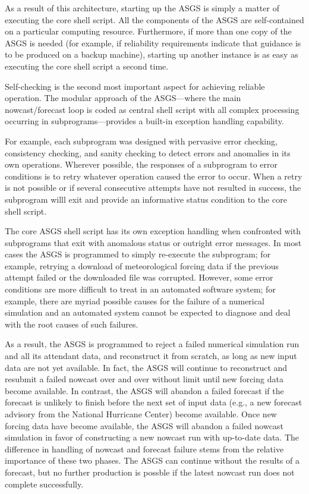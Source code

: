 \documentclass[jmse,article,submit,moreauthors,pdftex,12pt,a4paper]{mdpi}
\begin{document}
As a result of this architecture, starting up the ASGS is simply a 
matter of executing the core shell script. All the components of the 
ASGS are self-contained on a particular computing resource. 
Furthermore, if more than one copy of the ASGS is needed (for 
example, if reliability requirements indicate that guidance is to be 
produced on a backup machine), starting up another instance is as 
easy as executing the core shell script a second time.

Self-checking is the second most important aspect for achieving 
reliable operation. The modular approach of the ASGS---where the 
main nowcast/forecast loop is coded as central shell script with all 
complex processing occurring in subprograms---provides a built-in
exception handling capability. 

For example, each subprogram was designed with pervasive error 
checking, consistency checking, and sanity checking to detect errors 
and anomalies in its own operations. Wherever possible, the 
responses of a subprogram to error conditions is to retry whatever 
operation caused the error to occur. When a retry is not possible or 
if several consecutive attempts have not resulted in success, the 
subprogram willl exit and provide an informative status condition to 
the core shell script. 

The core ASGS shell script has its own exception handling when 
confronted with subprograms that exit with anomalous status or 
outright error messages. In most cases the ASGS is programmed to 
simply re-execute the subprogram; for example, retrying a download 
of meteorological forcing data if the previous attempt failed or the 
downloaded file was corrupted. However, some error conditions are 
more difficult to treat in an automated software system; for 
example, there are myriad possible causes for the failure of a 
numerical simulation and an automated system cannot be expected to 
diagnose and deal with the root causes of such failures. 

As a result, the ASGS is programmed to reject a failed numerical 
simulation run and all its attendant data, and reconstruct it from 
scratch, as long as new input data are not yet available. In fact, 
the ASGS will continue to reconstruct and resubmit a failed nowcast 
over and over without limit until new forcing data become available. 
In contrast, the ASGS will abandon a failed forecast if the forecast 
is unlikely to finish before the next set of input data (e.g., a new 
forecast advisory from the National Hurricane Center) become 
available. Once new forcing data have become available, the ASGS 
will abandon a failed nowcast simulation in favor of constructing a 
new nowcast run with up-to-date data. The difference in handling of 
nowcast and forecast failure stems from the relative importance of 
these two phases. The ASGS can continue without the results of a 
forecast, but no further production is possble if the latest nowcast 
run does not complete successfully. 
\end{document}
